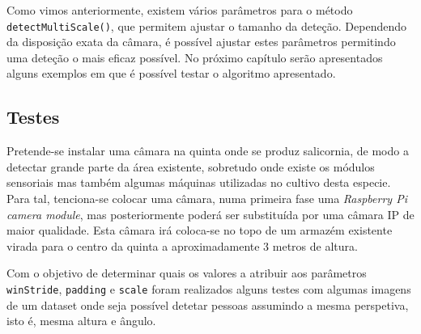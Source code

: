 Como vimos anteriormente, existem vários parâmetros para o método \linebreak \texttt{detectMultiScale()}, que permitem ajustar o tamanho da deteção. Dependendo da disposição exata da câmara, é possível ajustar estes parâmetros permitindo uma deteção o mais eficaz possível. No próximo capítulo serão apresentados alguns exemplos em que é possível testar o algoritmo apresentado.  



























\iffalse


\subsection{Testes}

Pretende-se instalar uma câmara na quinta onde se produz salicornia, de modo a detectar grande parte da área existente, sobretudo onde existe os módulos sensoriais mas também algumas máquinas utilizadas no cultivo desta especie. Para tal, tenciona-se colocar uma câmara, numa primeira fase uma \textit{Raspberry Pi camera module}, mas posteriormente poderá ser substituída por uma câmara IP de maior qualidade. Esta câmara irá coloca-se no topo de um armazém existente virada para o centro da quinta a aproximadamente 3 metros de altura. 

Com o objetivo de determinar quais os valores a atribuir aos parâmetros \texttt{winStride}, \texttt{padding} e \texttt{scale} foram realizados alguns testes com algumas imagens de um dataset onde seja possível detetar pessoas assumindo a mesma perspetiva, isto é, mesma altura e ângulo.  

